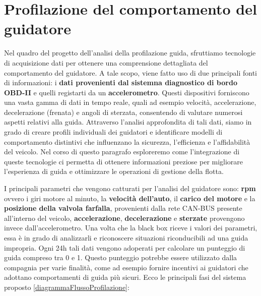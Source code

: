 \documentclass[12pt, a4paper, italian]{report}
\numberwithin{figure}{chapter}
\numberwithin{table}{chapter}
\begin{document}
\section{Profilazione del comportamento del guidatore}
\label{sec:AnalisiProfilazione}
Nel quadro del progetto dell'analisi della profilazione guida, sfruttiamo tecnologie di acquisizione dati per ottenere una comprensione dettagliata del comportamento del guidatore. A tale scopo, viene fatto uso di due principali fonti di informazioni: i \textbf{dati provenienti dal sistemna diagnostico di bordo OBD-II} e quelli registarti da un \textbf{accelerometro}. Questi dispositivi forniscono una vasta gamma di dati in tempo reale, quali ad esempio velocità, accelerazione, decelerazione (frenata) e angoli di sterzata, consentendo di valutare numerosi aspetti relativi alla guida. Attraverso l'analisi approfondita di tali dati, siamo in grado di creare profili individuali dei guidatori e identificare modelli di comportamento distintivi che influenzano la sicurezza, l'efficienza e l'affidabilità del veicolo. Nel corso di questo paragrafo esploreremo come l'integrazione di queste tecnologie ci permetta di ottenere informazioni preziose per migliorare l'esperienza di guida e ottimizzare le operazioni di gestione della flotta.

\vspace{1cm} 

I principali parametri che vengono catturati per l'analisi del guidatore sono: \textbf{rpm} ovvero i giri motore al minuto, la \textbf{velocità dell'auto}, il \textbf{carico del motore} e la \textbf{posizione della valvola farfalla}, provenienti dalla rete CAN-BUS presente all'interno del veicolo, \textbf{accelerazione}, \textbf{decelerazione} e \textbf{sterzate} provengono invece dall'accelerometro. Una volta che la black box riceve i valori dei parametri, essa è in grado di analizzarli e riconoscere situazioni riconducibili ad una guida impropria. Ogni 24h tali dati vengono adoperati per calcolare un punteggio di guida compreso tra 0 e 1. Questo punteggio potrebbe essere utilizzato dalla compagnia per varie finalità, come ad esempio fornire incentivi ai guidatori che adottano comportamenti di guida più sicuri. Ecco le principali fasi del sistema proposto \ref{diagrammaFlussoProfilazione}:

\vspace{1.2cm}
\end{document}
